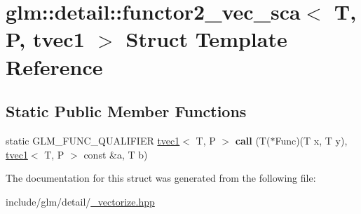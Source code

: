 \hypertarget{structglm_1_1detail_1_1functor2__vec__sca_3_01T_00_01P_00_01tvec1_01_4}{}\section{glm\+:\+:detail\+:\+:functor2\+\_\+vec\+\_\+sca$<$ T, P, tvec1 $>$ Struct Template Reference}
\label{structglm_1_1detail_1_1functor2__vec__sca_3_01T_00_01P_00_01tvec1_01_4}
\subsection*{Static Public Member Functions}
\begin{DoxyCompactItemize}
\item 
\mbox{\label{structglm_1_1detail_1_1functor2__vec__sca_3_01T_00_01P_00_01tvec1_01_4_a2a66b135799442e1bdee02afc859064d}} 
static G\+L\+M\+\_\+\+F\+U\+N\+C\+\_\+\+Q\+U\+A\+L\+I\+F\+I\+ER \hyperlink{structglm_1_1tvec1}{tvec1}$<$ T, P $>$ {\bfseries call} (T($\ast$Func)(T x, T y), \hyperlink{structglm_1_1tvec1}{tvec1}$<$ T, P $>$ const \&a, T b)
\end{DoxyCompactItemize}


The documentation for this struct was generated from the following file\+:\begin{DoxyCompactItemize}
\item 
include/glm/detail/\hyperlink{__vectorize_8hpp}{\+\_\+vectorize.\+hpp}\end{DoxyCompactItemize}
